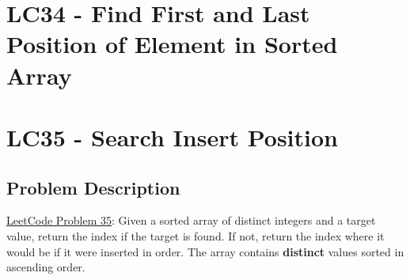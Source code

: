 \documentclass[justified]{tufte-book}
\begin{document}
\section{LC34 - Find First and Last Position of Element in Sorted Array} \label{sec:lc34_find_first_last_position_sorted_array}

\section{LC35 - Search Insert Position} \label{sec:lc35_search_insert_position}
\subsection{Problem Description}
\href{https://leetcode.com/problems/search-insert-position/}{LeetCode Problem 35}: Given a sorted array of distinct integers and a target value, return the index if the target is found. If not, return the index where it would be if it were inserted in order. The array contains \textbf{distinct} values sorted in ascending order. 
\end{document}

